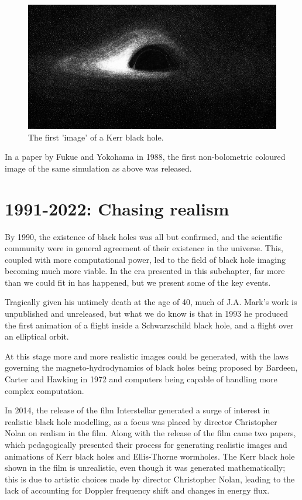 \documentclass[oneside,openright,frontopenright, singlespacing]{dmathesis}
\begin{document}
\begin{figure}[!ht]
	\centering
	\includegraphics[width=0.45\linewidth]{img/Luminet-drawing}
	\caption{The first 'image' of a Kerr black hole. \cite{luminet1979image}}
	\label{fig:Figure1.2}
\end{figure}

\vspace{1em}
	In a paper by Fukue and Yokohama in 1988, the first non-bolometric coloured image of the same simulation as above was released\cite{fukue1988color}.

\section{1991-2022: Chasing realism}\label{sec:Section1.3}

	By 1990, the existence of black holes was all but confirmed, and the scientific community were in general agreement of their existence in the universe. This, coupled with more computational power, led to the field of black hole imaging becoming much more viable. In the era presented in this subchapter, far more than we could fit in has happened, but we present some of the key events.

\vspace{1em}
	Tragically given his untimely death at the age of 40, much of J.A. Mark's work is unpublished and unreleased, but what we do know is that in 1993 he produced the first animation of a flight inside a Schwarzschild black hole, and a flight over an elliptical orbit\cite{InfinitelyCurved}.

\vspace{1em}
	At this stage more and more realistic images could be generated, with the laws governing the magneto-hydrodynamics of black holes being proposed by Bardeen, Carter and Hawking in 1972\cite{bardeen1973four} and computers being capable of handling more complex computation.

\vspace{1em}
	In 2014, the release of the film Interstellar generated a surge of interest in realistic black hole modelling, as a focus was placed by director Christopher Nolan on realism in the film. Along with the release of the film came two papers\cite{thorne2015gravitational}\cite{thorne2015visualizing}, which pedagogically presented their process for generating realistic images and animations of Kerr black holes and Ellis-Thorne wormholes. The Kerr black hole shown in the film is unrealistic, even though it was generated mathematically; this is due to artistic choices made by director Christopher Nolan, leading to the lack of accounting for Doppler frequency shift and changes in energy flux.
\end{document}
